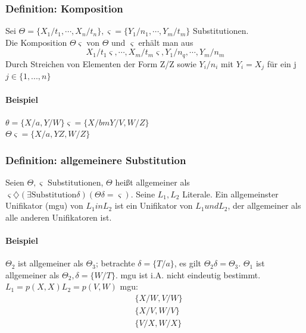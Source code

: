 \documentclass[12pt, a4paper]{article}
\begin{document}
\subsubsection*{Definition: Komposition}

Sei $\Theta = \{ X_1 / t_1, \cdots, X_n / t_n \}, \varsigma = \{ Y_1 / n_1, \cdots, Y_m / t_m \}$ Substitutionen. \\
Die Komposition $\Theta\varsigma$ von $\Theta$ und $\varsigma$ erhält man aus 
\begin{equation}
X_1 / t_1\varsigma, \cdots, X_m / t_m\varsigma, Y_1 / n_q, \cdots, Y_m / n_m
\end{equation}
Durch Streichen von Elementen der Form Z/Z sowie $Y_i / n_i$ mit $Y_i = X_j$ für ein j$j \in \{1, ..., n\}$

\paragraph{Beispiel} $\theta= \{ X/a,  Y/W \} \varsigma=\{X/ bm Y/ V, W/Z \}$ \\
$\Theta\varsigma = \{ X/a, YZ, W/Z \}$

\subsubsection*{Definition: allgemeinere Substitution}
Seien $\Theta, \varsigma$ Substitutionen, $\Theta$ heißt allgemeiner als $\varsigma \diamondsuit (\exists \text{Substitution} \delta)(\Theta \delta = \varsigma)$.
Seine $L_1, L_2$ Literale. Ein allgemeinster Unifikator (mgu) von $L_1 in L_2$ ist ein Unifikator von $L_1 und L_2$, der allgemeiner als alle anderen Unifikatoren ist.

\paragraph{Beispiel} $\Theta_2$  ist allgemeiner als $\Theta_3$; betrachte $\delta = \{T / a\}$, es gilt $\Theta_2\delta = \Theta_3$. $\Theta_1$ ist allgemeiner als $\Theta_2, \delta = \{ W / T \}$. mgu ist i.A. nicht eindeutig bestimmt. $L_1 = p(X,X) L_2 = p(V,W)$
mgu: \\
\begin{equation}
\begin{split}
&\{ X/W, V/W \} \\
&\{ X / V, W/V\} \\
&\{ V/X, W/X \}
\end{split}
\end{equation}
\end{document}
